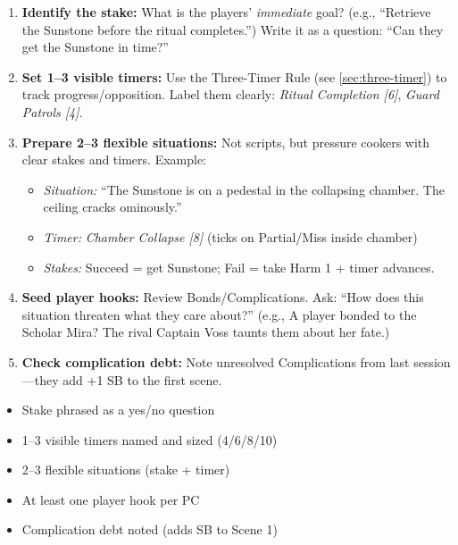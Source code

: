 \begin{enumerate}
  \item \textbf{Identify the stake:} What is the players' \textit{immediate} goal? (e.g., ``Retrieve the Sunstone before the ritual completes.'') Write it as a question: ``Can they get the Sunstone in time?''
  \item \textbf{Set 1--3 visible timers:} Use the Three-Timer Rule (see \ref{sec:three-timer}) to track progress/opposition. Label them clearly: \emph{Ritual Completion [6]}, \emph{Guard Patrols [4]}.
  \item \textbf{Prepare 2--3 flexible situations:} Not scripts, but pressure cookers with clear stakes and timers. Example:
    \begin{itemize}
      \item \textit{Situation:} ``The Sunstone is on a pedestal in the collapsing chamber. The ceiling cracks ominously.''
      \item \textit{Timer:} \emph{Chamber Collapse [8]} (ticks on Partial/Miss inside chamber)
      \item \textit{Stakes:} Succeed = get Sunstone; Fail = take Harm 1 + timer advances.
    \end{itemize}
  \item \textbf{Seed player hooks:} Review Bonds/Complications. Ask: ``How does this situation threaten what they care about?'' (e.g., A player bonded to the Scholar Mira? The rival Captain Voss taunts them about her fate.)
  \item \textbf{Check complication debt:} Note unresolved Complications from last session---they add +1 SB to the first scene.
\end{enumerate}

\begin{tcolorbox}[colback=blue!5!white, colframe=blue!75!black, title=Scenario Prep Checklist,breakable]
  \begin{itemize}
    \item [ ] Stake phrased as a yes/no question
    \item [ ] 1--3 visible timers named and sized (4/6/8/10)
    \item [ ] 2--3 flexible situations (stake + timer)
    \item [ ] At least one player hook per PC
    \item [ ] Complication debt noted (adds SB to Scene 1)
  \end{itemize}
\end{tcolorbox}

